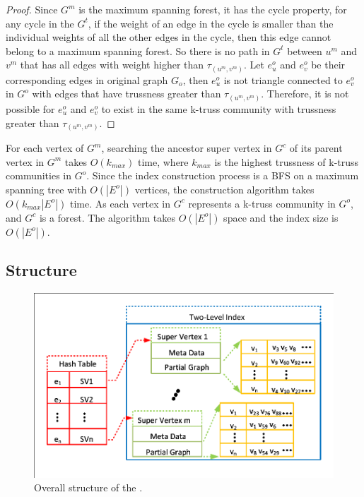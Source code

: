 \begin{proof}
Since $G^m$ is the maximum spanning forest, it has the cycle property, \ie for any cycle in the \inducedgraph{} $G^t$, if the weight of an edge in the cycle is smaller than the individual weights of all the other edges in the cycle, then this edge cannot belong to a maximum spanning forest. So there is no path in $G^t$ between $u^m$ and $v^m$ that has all edges with weight higher than $\tau_{(u^m,v^m)}$. Let $e^{o}_{u}$ and $e^{o}_{v}$ be their corresponding edges in original graph $G_o$, then $e^{o}_{u}$ is not triangle connected to $e^{o}_{v}$ in $G^o$ with edges that have trussness greater than $\tau_{(u^m,v^m)}$. Therefore, it is not possible for $e^{o}_{u}$ and $e^{o}_{v}$ to exist in the same k-truss community with trussness greater than $\tau_{(u^m,v^m)}$.
\end{proof}

For each vertex of $G^m$, searching the ancestor super vertex in $G^c$ of its parent vertex in $G^m$ takes $O(k_{max})$ time, where $k_{max}$ is the highest trussness of k-truss communities in $G^o$. Since the index construction process is a BFS on a maximum spanning tree with $O(|E^o|)$ vertices, the \treeindex{} construction algorithm takes $O(k_{max}|E^o|)$ time. As each vertex in $G^c$ represents a k-truss community in $G^o$, and $G^c$ is a forest. The algorithm takes $O(|E^o|)$ space and the index size is $O(|E^o|)$. %
%
%

\subsection{\TwoLevelIndex Structure}
\label{structure}

\begin{figure}[ht]
    \centering
    \includegraphics[width=0.8\linewidth, trim={0.1cm 0.1cm, 0.1cm, 0.1cm}, clip]{./figures/structure.pdf}
    \caption{Overall structure of the \twolevelindex{}.}
    \label{fig:structure}
\end{figure}

